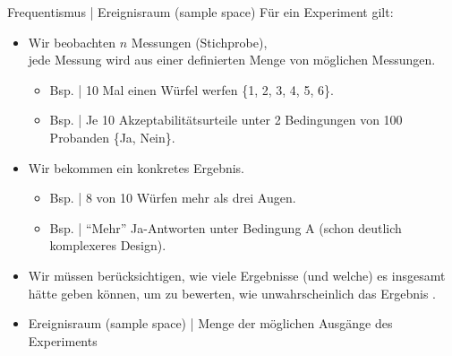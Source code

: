 \begin{frame}
  {Frequentismus | Ereignisraum (sample space)}
  Für ein Experiment gilt:\\
  \Halbzeile
  \begin{itemize}[<+->]
    \item Wir beobachten \alert{$n$ Messungen} (Stichprobe),\\
      jede Messung wird aus einer \alert{definierten Menge von möglichen Messungen}.
      \Halbzeile
      \begin{itemize}[<+->]
        \item Bsp. | 10 Mal einen Würfel werfen \{1, 2, 3, 4, 5, 6\}.
          \Viertelzeile
        \item Bsp. | Je 10 Akzeptabilitätsurteile unter 2 Bedingungen von 100 Probanden \{Ja, Nein\}.
      \end{itemize}
      \Zeile
    \item Wir bekommen ein \alert{konkretes Ergebnis}.
      \Halbzeile
      \begin{itemize}[<+->]
        \item Bsp. | 8 von 10 Würfen mehr als drei Augen.
          \Viertelzeile
        \item Bsp. | "`Mehr"' Ja-Antworten unter Bedingung A (schon deutlich komplexeres Design).
      \end{itemize}
      \Halbzeile
    \item Wir müssen berücksichtigen, \alert{wie viele Ergebnisse (und welche) es insgesamt\\
      hätte geben können}, um zu bewerten, wie unwahrscheinlich das Ergebnis .
      \Viertelzeile
    \item \alert{Ereignisraum (sample space)} | Menge der möglichen Ausgänge des Experiments
  \end{itemize}
\end{frame}

